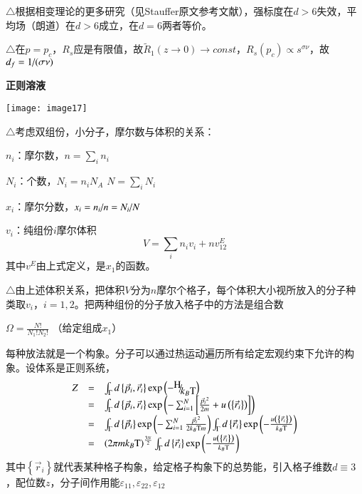 \documentclass{article} %
\begin{document}
\noindent $\mathrm{\triangle}$根据相变理论的更多研究（见Stauffer原文参考文献），强标度在$d>6$失效，平均场（朗道）在$d>6$成立，在$d=6$两者等价。

\noindent $\mathrm{\triangle}$在$p=p_{c} $，$R_{s} $应是有限值，故$\widetilde{R}_{1} \left(z\to 0\right)\to const$，$R_{s} \left(p_{c} \right)\propto s^{\sigma \nu } $，故$d_{f} ={1\mathord{\left/ {\vphantom {1 (\sigma \nu )}} \right. \kern-\nulldelimiterspace} (\sigma \nu )} $ 

\noindent \eject 

\noindent \textbf{正则溶液}

\noindent \texttt{[image: image17]}

\noindent $\mathrm{\triangle}$考虑双组份，小分子，摩尔数与体积的关系：

\noindent $n_{i} $：摩尔数，$n=\sum _{i}n_{i}  $ 

\noindent $N_{i} $：个数，$N_{i} =n_{i} N_{A} $  $N=\sum _{i}N_{i}  $ 

\noindent $x_{i} $：摩尔分数，$x_{i} ={n_{i} \mathord{\left/ {\vphantom {n_{i}  n}} \right. \kern-\nulldelimiterspace} n} ={N_{i} \mathord{\left/ {\vphantom {N_{i}  N}} \right. \kern-\nulldelimiterspace} N} $ 

\noindent $v_{i} $：纯组份$i$摩尔体积
\[V=\sum _{i}n_{i}  v_{i} +nv_{12}^{E} \] 
其中$v^{E} $由上式定义，是$x_{1} $的函数。

\noindent $\mathrm{\triangle}$由上述体积关系，把体积$V$分为$n$摩尔个格子，每个体积大小视所放入的分子种类取$v_{i} $，$i=1,2$。把两种组份的分子放入格子中的方法是组合数

 $\Omega =\frac{N!}{N_{1} !N_{2} !} $ （给定组成$x_{1} $）

\noindent 每种放法就是一个构象。分子可以通过热运动遍历所有给定宏观约束下允许的构象。设体系是正则系统，
\[\begin{array}{rcl} {Z} & {=} & {\int _{\Gamma }d\left\{\vec{p}_{i} ,\vec{r}_{i} \right\} \exp \left(-{\raise0.7ex\hbox{$ {\rm H}  $}\!\mathord{\left/ {\vphantom {{\rm H}  k_{B} {\rm T} }} \right. \kern-\nulldelimiterspace}\!\lower0.7ex\hbox{$ k_{B} {\rm T}  $}} \right)} \\ {} & {=} & {\int _{\Gamma }d\left\{\vec{p}_{i} ,\vec{r}_{i} \right\}\exp \left(-\sum _{i=1}^{N}\left[\frac{\vec{p}_{i} {}^{2} }{2m} +u\left(\left\{\vec{r}_{i} \right\}\right)\right] \right) } \\ {} & {=} & {\int _{\Gamma }d\left\{\vec{p}_{i} \right\} \exp \left(-\sum _{i=1}^{N}\frac{\vec{p}_{i} {}^{2} }{2k_{B} {\rm T} m}  \right)\int _{\Gamma }d\left\{\vec{r}_{i} \right\} \exp \left(-\frac{u\left(\left\{\vec{r}_{i} \right\}\right)}{k_{B} {\rm T} } \right)} \\ {} & {=} & {\left(2\pi mk_{B} {\rm T} \right)^{\frac{3N}{2} } \int _{\Gamma }d\left\{\vec{r}_{i} \right\} \exp \left(-\frac{u\left(\left\{\vec{r}_{i} \right\}\right)}{k_{B} {\rm T} } \right)} \end{array}\] 
其中$\left\{\vec{r}_{i} \right\}$就代表某种格子构象，给定格子构象下的总势能，引入格子维数$d\equiv 3$，配位数$z$，分子间作用能$\varepsilon _{11} ,\varepsilon _{22} ,\varepsilon _{12} $ 
\end{document}
